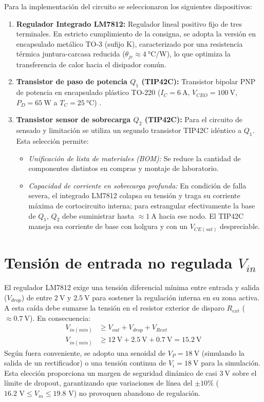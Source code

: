 Para la implementación del circuito se seleccionaron los siguientes dispositivos:
\begin{enumerate}
    \item \textbf{Regulador Integrado LM7812:} Regulador lineal positivo fijo de tres terminales. En estricto
    cumplimiento de la consigna, se adopta la versión en encapsulado metálico TO-3 (sufijo K), caracterizado por una
    resistencia térmica juntura-carcasa reducida ($\theta_{jc} \approx \SI{4}{\celsius/\watt}$), lo que optimiza la transferencia de calor hacia el
    disipador común.
    \item \textbf{Transistor de paso de potencia $Q_1$ (TIP42C):} Transistor bipolar PNP de potencia en encapsulado
    plástico TO-220 ($I_C = \SI{6}{\ampere}$, $V_{CEO} = \SI{100}{\volt}$, $P_D = \SI{65}{\watt}$ a
    $T_C = \SI{25}{\celsius}$) \cite{onsemi_tip42c}.
    \item \textbf{Transistor sensor de sobrecarga $Q_2$ (TIP42C):} Para el circuito de sensado y limitación se
    utiliza un segundo transistor TIP42C idéntico a $Q_1$. Esta selección permite:
    \begin{itemize}
        \item \emph{Unificación de lista de materiales (BOM):} Se reduce la cantidad de componentes distintos en compras
        y montaje de laboratorio.
        \item \emph{Capacidad de corriente en sobrecarga profunda:} En condición de falla severa, el integrado
        LM7812 colapsa su tensión y traga su corriente máxima de cortocircuito interna; para estrangular efectivamente
        la base de $Q_1$, $Q_2$ debe suministrar hasta $\approx \SI{1}{\ampere}$ hacia ese nodo. El TIP42C maneja esa corriente de base con holgura y con un $V_{CE(sat)}$
        despreciable.
    \end{itemize}
\end{enumerate}

\section{Tensión de entrada no regulada $V_{in}$}
\label{sec.c5:vin}

El regulador LM7812 exige una tensión diferencial mínima entre entrada y salida ($V_{drop}$) de entre
$\SI{2}{\volt}$ y $\SI{2.5}{\volt}$ para sostener la regulación interna en su zona activa. A esta caída debe
sumarse la tensión en el resistor exterior de disparo $R_{ext}$ ($\approx \SI{0.7}{\volt}$). En consecuencia:
\begin{align*}
    V_{in(min)} &\ge V_{out} + V_{drop} + V_{Rext} \\
    V_{in(min)} &\ge \SI{12}{\volt} + \SI{2.5}{\volt} + \SI{0.7}{\volt} = \SI{15.2}{\volt}
\end{align*}
Según fuera conveniente, se adopto una senoidal de $V_P = \SI{18}{\volt}$ (simulando la salida de un rectificador)
o una tensión continua de $V_i = \SI{18}{\volt}$ para la simulación. Esta elección proporciona un margen
de seguridad dinámico de casi $\SI{3}{\volt}$ sobre el límite de dropout, garantizando que variaciones de línea
del $\pm 10\%$ ($16.2\text{ V} \le V_{in} \le 19.8\text{ V}$) no provoquen abandono de regulación.

